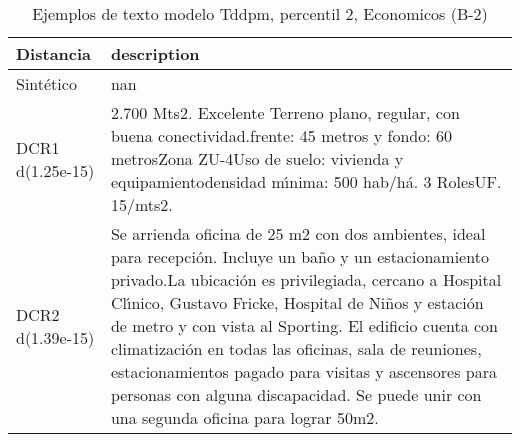 \begin{table}[H]
\centering
\fontsize{10}{14}\selectfont
\caption{Ejemplos de texto modelo Tddpm, percentil 2, Economicos (B-2)}
\label{table-example-economicos-b-2-tddpm_mlp-2p-text}
\begin{tabular}{|l|m{35em}|}
\hline
\rowcolor[gray]{0.8}
Distancia & description \\
\hline Sintético & nan \\
\hline DCR1 d(1.25e-15) & 2.700 Mts2. Excelente Terreno plano, regular, con buena conectividad.frente: 45 metros y fondo: 60 metrosZona ZU-4Uso de suelo: vivienda y equipamientodensidad m{\'\i}nima: 500 hab/h\'a. 3 RolesUF. 15/mts2. \\
\hline DCR2 d(1.39e-15) & Se arrienda oficina de 25 m2  con dos ambientes, ideal para recepci\'on. Incluye un ba\~no y un estacionamiento privado.La ubicaci\'on es privilegiada, cercano a Hospital Cl{\'\i}nico,  Gustavo Fricke,  Hospital de Ni\~nos y estaci\'on de metro y con vista al Sporting. El edificio cuenta con climatizaci\'on en todas las oficinas, sala de reuniones, estacionamientos pagado para visitas y ascensores para personas con alguna discapacidad. Se puede unir con una segunda oficina para lograr 50m2. \\
\hline
\end{tabular}
\end{table}
